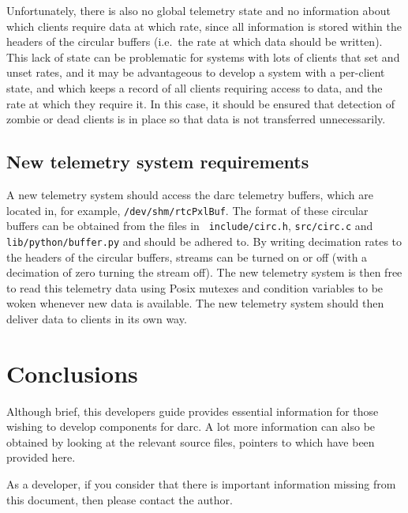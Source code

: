 \documentclass[a4,10pt]{article}
\begin{document}
Unfortunately, there is also no global telemetry state and no
information about which clients require data at which rate, since
all information is stored within the headers of the circular buffers
(i.e.\ the rate at which data should be written).  This lack of state
can be problematic for systems with lots of clients that set and unset
rates, and it may be advantageous to develop a system with a
per-client state, and which keeps a record of all clients requiring
access to data, and the rate at which they require it.  In this case,
it should be ensured that detection of zombie or dead clients is in
place so that data is not transferred unnecessarily.  

\subsection{New telemetry system requirements}
A new telemetry system should access the darc telemetry buffers, which
are located in, for example, {\tt /dev/shm/rtcPxlBuf}.  The format of
these circular buffers can be obtained from the files in {\tt
  include/circ.h}, {\tt src/circ.c} and {\tt lib/python/buffer.py} and
should be adhered to.  By writing decimation rates to the headers of
the circular buffers, streams can be turned on or off (with a
decimation of zero turning the stream off).  The new telemetry system
is then free to read this telemetry data using Posix mutexes and
condition variables to be woken whenever new data is available.  The
new telemetry system should then deliver data to clients in its own
way.

\section{Conclusions}
Although brief, this developers guide provides essential information
for those wishing to develop components for darc.  A lot more
information can also be obtained by looking at the relevant source
files, pointers to which have been provided here.

As a developer, if you consider that there is important information
missing from this document, then please contact the author.
\end{document}
